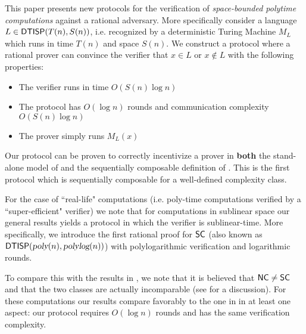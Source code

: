 This paper presents new protocols for the verification of {\em space-bounded polytime computations} against a rational adversary. More specifically consider a language $L \in {\ensuremath{\mathsf{DTISP}}}(T(n), S(n))$, i.e. recognized by a deterministic Turing Machine $M_L$ which runs in time $T(n)$ and space $S(n)$. 
We construct a protocol where a rational prover can
convince the verifier that $x \in L$ or $x \notin L$ with the following properties: 
\begin{itemize}
	\item The verifier runs in time $O(S(n) \log n)$
	\item The protocol has $O(\log n)$ rounds and communication complexity $O(S(n) \log n)$
	\item The prover simply runs $M_L(x)$ 
\end{itemize}
Our protocol can be proven to correctly incentivize a prover in {\bf both} the stand-alone model of \cite{am} and the sequentially composable definition of \cite{cg15}. This is the first protocol which is sequentially composable for a well-defined complexity class. 

For the case of ``real-life" computations (i.e. poly-time computations verified by a ``super-efficient" verifier) we 
note that for computations in sublinear space our general results yields a protocol in which the verifier is sublinear-time. More specifically, we introduce the first rational proof for ${\mathsf{SC}}$ (also known as ${\mathsf{DTISP}}({\textsl{poly}}(n), {\textsl{polylog}}(n))$) with polylogarithmic verification and logarithmic rounds. 

To compare this with the results in \cite{ratsumchecks}, we note that it is believed that ${\mathsf{NC}} \not = {\mathsf{SC}}$ and that the two classes are actually incomparable (see \cite{SCcompleteness} for a discussion). For these computations our results compare
favorably to the one in \cite{ratsumchecks} in at least one aspect: our protocol requires $O(\log n )$ rounds and has the same verification complexity.

